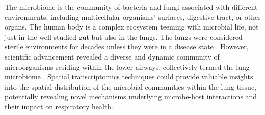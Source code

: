 \documentclass[10pt,letterpaper]{article}
\begin{document}
\noindent The microbiome is the community of bacteria and fungi associated with different environments, including multicellular organisms' surfaces, digestive tract, or other organs. The human body is a complex ecosystem teeming with microbial life, not just in the well-studied gut but also in the lungs. The lungs were considered sterile environments for decades unless they were in a disease state \parencite{whiteside-2021}. However, scientific advancement revealed a diverse and dynamic community of microorganisms residing within the lower airways, collectively termed the lung microbiome \parencite{zhao-2021}\parencite{yagi-2021}. Spatial transcriptomics techniques could provide valuable insights into the spatial distribution of the microbial communities within the lung tissue, potentially revealing novel mechanisms underlying microbe-host interactions and their impact on respiratory health.

\renewcommand\thesubfigure{\Alph{subfigure}} %
\end{document}
